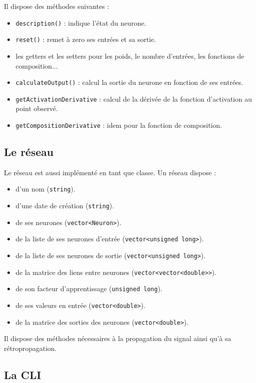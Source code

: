 \medskip

Il dispose des méthodes suivantes :
\begin{itemize}
  \item \verb+description()+ : indique l'état du neurone.
  \item \verb+reset()+ : remet à zero ses entrées et sa sortie.
  \item les getters et les setters pour les poids, le nombre d'entrées, les
  fonctions de composition...
  \item \verb+calculateOutput()+ : calcul la sortie du neurone en fonction
  de ses entrées.
  \item \verb+getActivationDerivative+ : calcul de la dérivée de la fonction
  d'activation au point observé.
  \item \verb+getCompositionDerivative+ : idem pour la fonction de composition.
\end{itemize}

\subsection{Le réseau}

Le réseau est aussi implémenté en tant que classe.
Un réseau dispose :
\begin{itemize}
  \item d'un nom (\verb+string+).
  \item d'une date de création (\verb+string+).
  \item de ses neurones (\verb+vector<Neuron>+).
  \item de la liste de ses neurones d'entrée (\verb+vector<unsigned long>+).
  \item de la liste de ses neurones de sortie (\verb+vector<unsigned long>+).
  \item de la matrice des liens entre neurones (\verb+vector<vector<double>>+).
  \item de son facteur d'apprentissage (\verb+unsigned long+).
  \item de ses valeurs en entrée (\verb+vector<double>+).
  \item de la matrice des sorties des neurones (\verb+vector<double>+).
\end{itemize}

\medskip

Il dispose des méthodes nécessaires à la propagation du signal ainsi qu'à
sa rétropropagation.

\subsection{La CLI}

